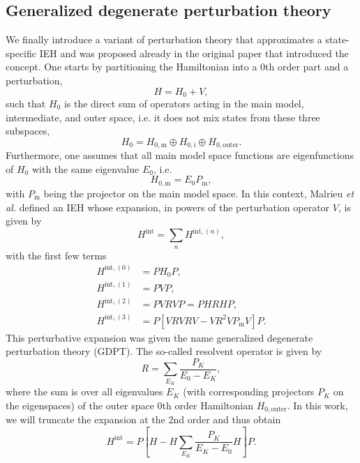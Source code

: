 \subsection{Generalized degenerate perturbation theory}
\label{Sec:GDPT}
We finally introduce a variant of perturbation theory that approximates a state-specific IEH and was proposed already in the original paper that introduced the concept.\cite{MalriDD_1985_809} One starts by partitioning the Hamiltonian into a 0th order part and a perturbation,
\begin{equation}
H = {H_0} + V,
\end{equation}				
such that $H_0$ is the direct sum of operators acting in the main model, intermediate, and outer space, i.e. it does not mix states from these three subspaces,
				\begin{equation}
				{H_0} = {H_{0,{\text{m}}}} \oplus {H_{0,{\text{i}}}} \oplus {H_{0,{\text{outer}}}}.
				\end{equation}				
Furthermore, one assumes that all main model space functions are eigenfunctions of $H_0$ with the same eigenvalue $E_0$, i.e.
				\begin{equation}
				{H_{0,{\text{m}}}} = {E_0}{P_{\text{m}}},
				\end{equation}						
with ${P_{\text{m}}}$ being the projector on the main model space. In this context, Malrieu \textit{et al.}\cite{MalriDD_1985_809} defined an IEH whose expansion, in powers of the perturbation operator $V$, is given by
 \begin{equation}
 {H^{{\text{int}}}} = \sum\limits_n {{H^{{\text{int}},(n)}}}, 
 \end{equation}						
with the first few terms
\begin{align}
  {H^{{\text{int}},(0)}} &= {P}{H_0}{P},  \\
  {H^{{\text{int}},(1)}} &= {P}V{P},  \\
  {H^{{\text{int}},(2)}} &= {P}VRV{P} = {P}HRH{P},  \\
  {H^{{\text{int}},(3)}} &= {P}\left[ {VRVRV - V{R^2}V{P_{\text{m}}}V} \right]{P}. 
\end{align}
This perturbative expansion was given the name generalized degenerate perturbation theory (GDPT). The so-called resolvent operator is given by
\begin{equation}
R = \sum\limits_{E_K^{}} {\frac{{{P_K}}}{{E_0^{} - {E_K}}}}, 
\end{equation}									
where the sum is over all eigenvalues $E_K$ (with corresponding projectors $P_K$ on the eigenspaces) of the outer space 0th order Hamiltonian $H_{0, \text{outer}}$. In this work, we will truncate the expansion at the 2nd order and thus obtain
	\begin{equation}
	\label{Eq:GDPT_Hamil}
	{H^{{\text{int}}}} = {P}\left[ {H - H\sum\limits_{{E_K}} {\frac{{{P_K}}}{{{E_K} - {E_0}}}} H} \right]{P}.
	\end{equation}						

